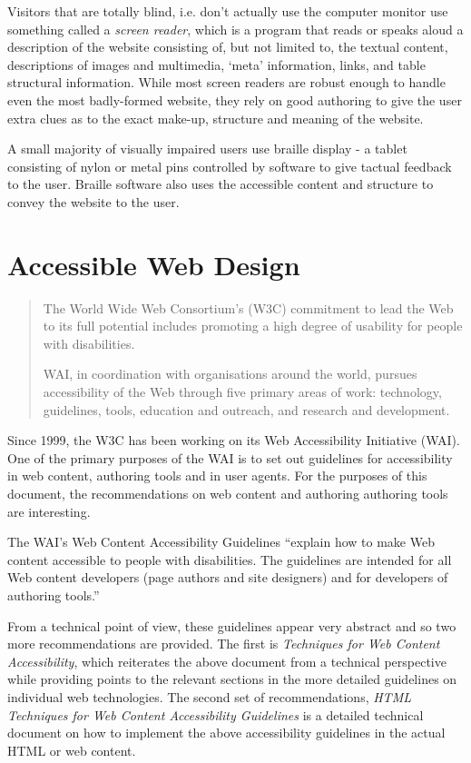 Visitors that are totally blind, i.e. don't actually use the computer monitor
use something called a \emph{screen reader}, which is a program that reads or
speaks aloud a description of the website consisting of, but not limited to,
the textual content, descriptions of images and multimedia, `meta' information,
links, and table structural information. While most screen readers are robust
enough to handle even the most badly-formed website, they rely on good
authoring to give the user extra clues as to the exact make-up, structure and
meaning of the website.

A small majority of visually impaired users use braille display - a tablet
consisting of nylon or metal pins controlled by software to give tactual
feedback to the user. Braille software also uses the accessible content and
structure to convey the website to the user.

\section{Accessible Web Design}

\begin{quotation}

The World Wide Web Consortium's (W3C) commitment to lead the Web to its full
potential includes promoting a high degree of usability for people with
disabilities.

WAI, in coordination with organisations around the world, pursues accessibility
of the Web through five primary areas of work: technology, guidelines, tools,
education and outreach, and research and development. \cite{w3c:wcag}

\end{quotation}

Since 1999, the W3C has been working on its Web Accessibility Initiative (WAI).
One of the primary purposes of the WAI is to set out guidelines for
accessibility in web content, authoring tools and in user agents. For the
purposes of this document, the recommendations on web content and authoring
authoring tools are interesting. 

The WAI's Web Content Accessibility Guidelines ``explain how to make Web content
accessible to people with disabilities. The guidelines are intended for all Web
content developers (page authors and site designers) and for developers of
authoring tools.''\cite{w3c:wcag} 

From a technical point of view, these guidelines appear very abstract and so
two more recommendations are provided. The first is \emph{Techniques for Web
Content Accessibility}\cite{w3c:wcagtechs}, which reiterates the above document
from a technical perspective while providing points to the relevant sections in
the more detailed guidelines on individual web technologies. The second set of
recommendations, \emph{HTML Techniques for Web Content Accessibility
Guidelines}\cite{w3c:wcaghtmltechs} is a detailed technical document on how to
implement the above accessibility guidelines in the actual HTML or web content. 

